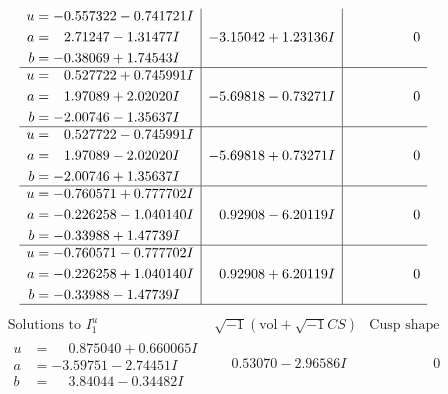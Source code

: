 \documentclass[1p]{elsarticle_modified}
\theoremstyle{definition}
\newcommand{\I}{\sqrt{-1}}
\begin{document}
$$\begin{array}{c|c|c}
\begin{aligned}
u &= -0.557322 - 0.741721 I \\
a &= \phantom{-}2.71247 - 1.31477 I \\
b &= -0.38069 + 1.74543 I\end{aligned}
 & -3.15042 + 1.23136 I & \phantom{-0.000000 } 0 \\ \hline\begin{aligned}
u &= \phantom{-}0.527722 + 0.745991 I \\
a &= \phantom{-}1.97089 + 2.02020 I \\
b &= -2.00746 - 1.35637 I\end{aligned}
 & -5.69818 - 0.73271 I & \phantom{-0.000000 } 0 \\ \hline\begin{aligned}
u &= \phantom{-}0.527722 - 0.745991 I \\
a &= \phantom{-}1.97089 - 2.02020 I \\
b &= -2.00746 + 1.35637 I\end{aligned}
 & -5.69818 + 0.73271 I & \phantom{-0.000000 } 0 \\ \hline\begin{aligned}
u &= -0.760571 + 0.777702 I \\
a &= -0.226258 - 1.040140 I \\
b &= -0.33988 + 1.47739 I\end{aligned}
 & \phantom{-}0.92908 - 6.20119 I & \phantom{-0.000000 } 0 \\ \hline\begin{aligned}
u &= -0.760571 - 0.777702 I \\
a &= -0.226258 + 1.040140 I \\
b &= -0.33988 - 1.47739 I\end{aligned}
 & \phantom{-}0.92908 + 6.20119 I & \phantom{-0.000000 } 0\\
 \hline 
 \end{array}$$\newpage$$\begin{array}{c|c|c}  
\text{Solutions to }I^u_{1}& \I (\text{vol} + \sqrt{-1}CS) & \text{Cusp shape}\\
 \hline 
\begin{aligned}
u &= \phantom{-}0.875040 + 0.660065 I \\
a &= -3.59751 - 2.74451 I \\
b &= \phantom{-}3.84044 - 0.34482 I\end{aligned}
 & \phantom{-}0.53070 - 2.96586 I & \phantom{-0.000000 } 0 \\ \hline\begin{aligned}

\end{aligned}
\end{array}$$
\end{document}
